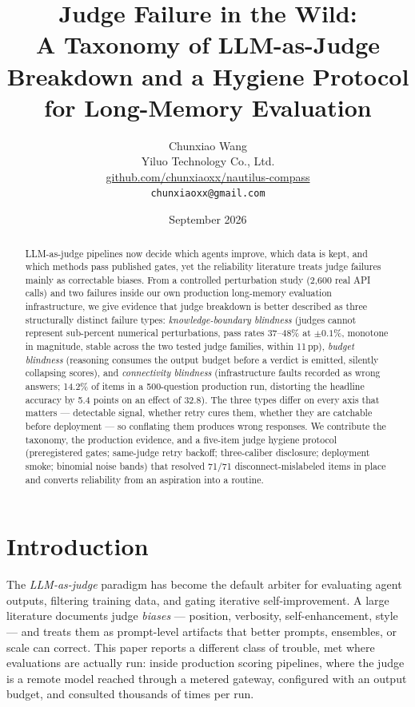 \documentclass[11pt]{article}
\title{Judge Failure in the Wild:\\
A Taxonomy of LLM-as-Judge Breakdown and a Hygiene Protocol for Long-Memory Evaluation}
\author{Chunxiao Wang \\
        Yiluo Technology Co., Ltd. \\
        \url{github.com/chunxiaoxx/nautilus-compass} \\
        \texttt{chunxiaoxx@gmail.com}}
\date{September 2026}
\begin{document}
\maketitle

\begin{abstract}
LLM-as-judge pipelines now decide which agents improve, which data is kept,
and which methods pass published gates, yet the reliability literature treats
judge failures mainly as correctable biases. From a controlled perturbation
study (2{,}600 real API calls) and two failures inside our own production
long-memory evaluation infrastructure, we give evidence that judge breakdown
is better described as three structurally distinct failure types:
\emph{knowledge-boundary blindness} (judges cannot represent sub-percent
numerical perturbations, pass rates 37--48\% at $\pm 0.1\%$, monotone in
magnitude, stable across the two tested judge families, within 11\,pp), \emph{budget blindness}
(reasoning consumes the output budget before a verdict is emitted,
silently collapsing scores), and \emph{connectivity blindness}
(infrastructure faults recorded as wrong answers; 14.2\% of items in a
500-question production run, distorting the headline accuracy by 5.4 points
on an effect of 32.8). The three types differ on every axis that matters ---
detectable signal, whether retry cures them, whether they are catchable
before deployment --- so conflating them produces wrong responses. We
contribute the taxonomy, the production evidence, and a five-item judge hygiene
protocol (preregistered gates; same-judge retry backoff; three-caliber
disclosure; deployment smoke; binomial noise bands) that resolved 71/71
disconnect-mislabeled items in place and converts reliability from an
aspiration into a routine.
\end{abstract}

\section{Introduction}
\label{sec:intro}

The \emph{LLM-as-judge} paradigm has become the default arbiter for
evaluating agent outputs, filtering training data, and gating iterative
self-improvement. A large literature documents judge \emph{biases} ---
position, verbosity, self-enhancement, style --- and treats them as
prompt-level artifacts that better prompts, ensembles, or scale can correct.
This paper reports a different class of trouble, met where evaluations are
actually run: inside production scoring pipelines, where the judge is a
remote model reached through a metered gateway, configured with an output
budget, and consulted thousands of times per run.
\end{document}
